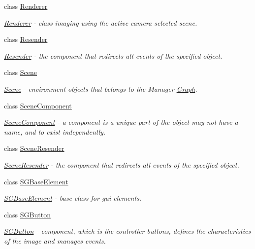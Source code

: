 \begin{DoxyCompactItemize}
class \hyperlink{classcsad_1_1_renderer}{Renderer}
\begin{DoxyCompactList}\small\item\em \hyperlink{classcsad_1_1_renderer}{Renderer} -\/ class imaging using the active camera selected scene. \end{DoxyCompactList}\item 
class \hyperlink{classcsad_1_1_resender}{Resender}
\begin{DoxyCompactList}\small\item\em \hyperlink{classcsad_1_1_resender}{Resender} -\/ the component that redirects all events of the specified object. \end{DoxyCompactList}\item 
class \hyperlink{classcsad_1_1_scene}{Scene}
\begin{DoxyCompactList}\small\item\em \hyperlink{classcsad_1_1_scene}{Scene} -\/ environment objects that belongs to the Manager \hyperlink{classcsad_1_1_graph}{Graph}. \end{DoxyCompactList}\item 
class \hyperlink{classcsad_1_1_scene_component}{Scene\-Component}
\begin{DoxyCompactList}\small\item\em \hyperlink{classcsad_1_1_scene_component}{Scene\-Component} -\/ a component is a unique part of the object may not have a name, and to exist independently. \end{DoxyCompactList}\item 
class \hyperlink{classcsad_1_1_scene_resender}{Scene\-Resender}
\begin{DoxyCompactList}\small\item\em \hyperlink{classcsad_1_1_scene_resender}{Scene\-Resender} -\/ the component that redirects all events of the specified object. \end{DoxyCompactList}\item 
class \hyperlink{classcsad_1_1_s_g_base_element}{S\-G\-Base\-Element}
\begin{DoxyCompactList}\small\item\em \hyperlink{classcsad_1_1_s_g_base_element}{S\-G\-Base\-Element} -\/ base class for gui elements. \end{DoxyCompactList}\item 
class \hyperlink{classcsad_1_1_s_g_button}{S\-G\-Button}
\begin{DoxyCompactList}\small\item\em \hyperlink{classcsad_1_1_s_g_button}{S\-G\-Button} -\/ component, which is the controller buttons, defines the characteristics of the image and manages events. \end{DoxyCompactList}\item 

\end{DoxyCompactItemize}
